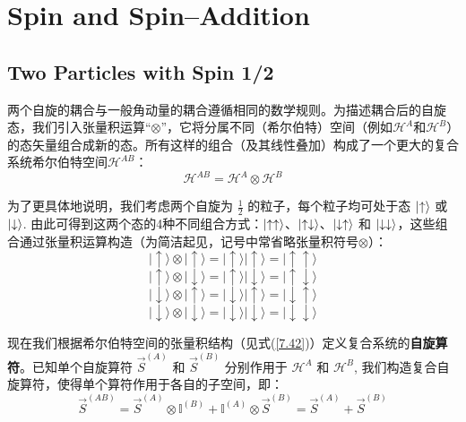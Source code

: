 \section{Spin and Spin–Addition}
\subsection{Two Particles with Spin 1/2}
两个自旋的耦合与一般角动量的耦合遵循相同的数学规则。为描述耦合后的自旋态，我们引入张量积运算“\(\otimes\)”，它将分属不同（希尔伯特）空间（例如\(\mathcal{H}^A\)和\(\mathcal{H}^B\)）的态矢量组合成新的态。所有这样的组合（及其线性叠加）构成了一个更大的复合系统希尔伯特空间\(\mathcal{H}^{AB}\)：
\begin{equation}
	\mathcal{H}^{AB} = \mathcal{H}^A \otimes \mathcal{H}^B \label{7.42}
\end{equation}

为了更具体地说明，我们考虑两个自旋为 \(\displaystyle \frac{1}{2}\) 的粒子，每个粒子均可处于态 \(\ket{\uparrow}\) 或 \(\ket{\downarrow}\). 由此可得到这两个态的4种不同组合方式：\(\ket{\uparrow\uparrow}\)、\(\ket{\uparrow\downarrow}\)、\(\ket{\downarrow\uparrow}\) 和 \(\ket{\downarrow\downarrow}\)，这些组合通过张量积运算构造（为简洁起见，记号中常省略张量积符号\(\otimes\)）：
\begin{equation}
	|\uparrow\rangle \otimes |\uparrow\rangle = |\uparrow\rangle|\uparrow\rangle = |\uparrow\uparrow\rangle \label{7.43}
\end{equation}
\begin{equation}
	|\uparrow\rangle \otimes |\downarrow\rangle = |\uparrow\rangle|\downarrow\rangle = |\uparrow\downarrow\rangle \label{7.44}
\end{equation}
\begin{equation}
	|\downarrow\rangle \otimes |\uparrow\rangle = |\downarrow\rangle|\uparrow\rangle = |\downarrow\uparrow\rangle \label{7.45}
\end{equation}
\begin{equation}
	|\downarrow\rangle \otimes |\downarrow\rangle = |\downarrow\rangle|\downarrow\rangle = |\downarrow\downarrow\rangle \label{7.46}
\end{equation}

现在我们根据希尔伯特空间的张量积结构（见式(\ref{7.42})）定义复合系统的\textbf{自旋算符}。已知单个自旋算符 \(\vec{S}^{(A)}\) 和 \(\vec{S}^{(B)}\) 分别作用于 \(\mathcal{H}^A\) 和 \(\mathcal{H}^B\), 我们构造复合自旋算符，使得单个算符作用于各自的子空间，即：
\begin{equation}
	\vec{S}^{(AB)} = \vec{S}^{(A)} \otimes \mathbb{I}^{(B)} + \mathbb{I}^{(A)} \otimes \vec{S}^{(B)} = \vec{S}^{(A)} + \vec{S}^{(B)} \label{7.47}
\end{equation}

